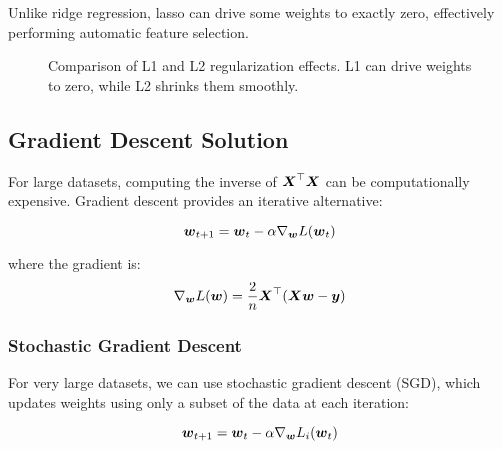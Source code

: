 Unlike ridge regression, lasso can drive some weights to exactly zero, effectively performing automatic feature selection.

\begin{figure}[htbp]
\centering
{}
\caption{Comparison of L1 and L2 regularization effects. L1 can drive weights to zero, while L2 shrinks them smoothly.}
\label{fig:regularization-comparison}
\end{figure}

\subsection{Gradient Descent Solution}

For large datasets, computing the inverse of $\boldsymbol{X}^\top \boldsymbol{X}$ can be computationally expensive. Gradient descent provides an iterative alternative:

\begin{equation}
\boldsymbol{w}_{t+1} = \boldsymbol{w}_t - \alpha \nabla_{\boldsymbol{w}} L(\boldsymbol{w}_t)
\end{equation}

where the gradient is:
\begin{equation}
\nabla_{\boldsymbol{w}} L(\boldsymbol{w}) = \frac{2}{n} \boldsymbol{X}^\top (\boldsymbol{X}\boldsymbol{w} - \boldsymbol{y})
\end{equation}

\subsubsection{Stochastic Gradient Descent}

For very large datasets, we can use stochastic gradient descent (SGD), which updates weights using only a subset of the data at each iteration:

\begin{equation}
\boldsymbol{w}_{t+1} = \boldsymbol{w}_t - \alpha \nabla_{\boldsymbol{w}} L_i(\boldsymbol{w}_t)
\end{equation}

